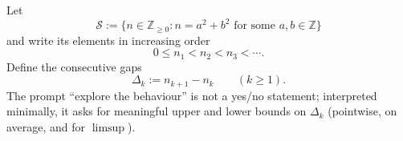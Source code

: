 Let
\[
\mathcal S := \{n\in\mathbb Z_{\ge 0}: n=a^2+b^2 \text{ for some } a,b\in\mathbb Z\}
\]
and write its elements in increasing order
\[
0\le n_1 < n_2 < n_3 < \cdots.
\]
Define the consecutive gaps
\[
\Delta_k := n_{k+1}-n_k\qquad (k\ge 1).
\]
The prompt ``explore the behaviour'' is not a yes/no statement; interpreted minimally, it asks for meaningful upper and lower bounds on $\Delta_k$ (pointwise, on average, and for $\limsup$).
